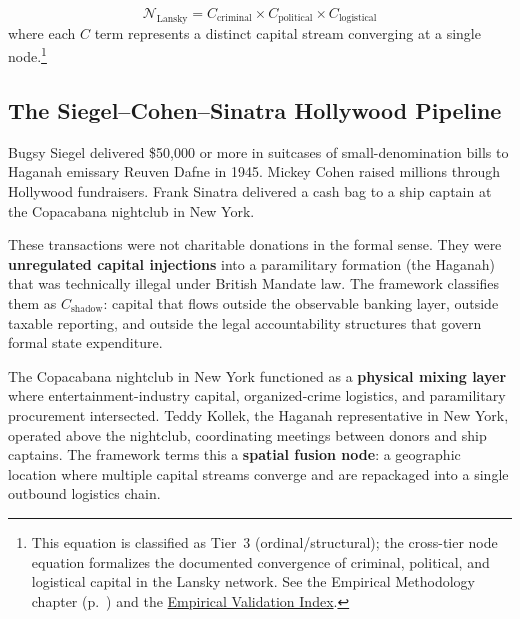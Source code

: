 \begin{equation}\label{eq:gp5-lansky-node}
\mathcal{N}_{\text{Lansky}} = C_{\text{criminal}} \times C_{\text{political}} \times C_{\text{logistical}}
\end{equation}
where each $C$ term represents a distinct capital stream converging at a single node.\footnote{This equation is classified as Tier~3 (ordinal/structural); the cross-tier node equation formalizes the documented convergence of criminal, political, and logistical capital in the Lansky network. See the Empirical Methodology chapter (p.~\pageref{ch:empirical_methodology}) and the \hyperref[app:empirical_index]{Empirical Validation Index}.}

\subsection{The Siegel--Cohen--Sinatra Hollywood Pipeline}

Bugsy Siegel delivered \$50,000 or more in suitcases of small-denomination bills to Haganah emissary Reuven Dafne in 1945. Mickey Cohen raised millions through Hollywood fundraisers. Frank Sinatra delivered a cash bag to a ship captain at the Copacabana nightclub in New York.

These transactions were not charitable donations in the formal sense. They were \textbf{unregulated capital injections} into a paramilitary formation (the Haganah) that was technically illegal under British Mandate law. The framework classifies them as $C_{\text{shadow}}$: capital that flows outside the observable banking layer, outside taxable reporting, and outside the legal accountability structures that govern formal state expenditure.

The Copacabana nightclub in New York functioned as a \textbf{physical mixing layer} where entertainment-industry capital, organized-crime logistics, and paramilitary procurement intersected. Teddy Kollek, the Haganah representative in New York, operated above the nightclub, coordinating meetings between donors and ship captains. The framework terms this a \textbf{spatial fusion node}: a geographic location where multiple capital streams converge and are repackaged into a single outbound logistics chain.

